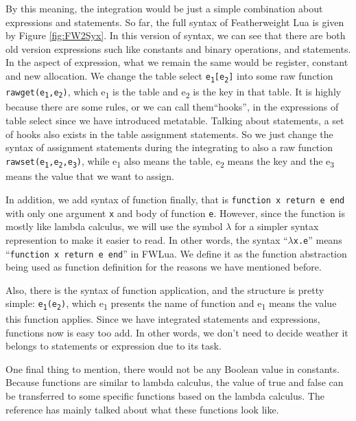 By this meaning, the integration would be just a simple combination about expressions and statements. So far, the full syntax of Featherweight Lua is given by Figure \ref{fig:FW2Syx}. In this version of syntax, we can see that there are both old version expressions such like constants and binary operations, and statements. In the aspect of expression, what we remain the same would be register, constant and new allocation. We change the table select {\tt e\textsubscript{1}[e\textsubscript{2}]} into some raw function {\tt rawget(e\textsubscript{1},e\textsubscript{2})}, which e\textsubscript{1} is the table and e\textsubscript{2} is the key in that table. It is highly because there are some rules, or we can call them``hooks'', in the expressions of table select since we have introduced metatable. Talking about statements, a set of hooks also exists in the table assignment statements. So we just change the syntax of assignment statements during the integrating to also a raw function {\tt rawset(e\textsubscript{1},e\textsubscript{2},e\textsubscript{3})}, while e\textsubscript{1} also means the table, e\textsubscript{2} means the key and the e\textsubscript{3} means the value that we want to assign. 

In addition, we add syntax of function finally, that is {\tt function x return e end} with only one argument {\tt x} and body of function {\tt e}. However, since the function is mostly like lambda calculus, we will use the symbol $\lambda$ for a simpler syntax represention to make it easier to read. In other words, the syntax ``{\tt $\lambda$x.e}'' means ``{\tt function x return e end}'' in FWLua. We define it as the function abstraction being used as function definition for the reasons we have mentioned before. 

Also, there is the syntax of function application, and the structure is pretty simple: {\tt e\textsubscript{1}(e\textsubscript{2})}, which e\textsubscript{1} presents the name of function and e\textsubscript{1} means the value this function applies. Since we have integrated statements and expressions, functions now is easy too add. In other words, we don't need to decide weather it belongs to statements or expression due to its task.

One final thing to mention, there would not be any Boolean value in constants. Because functions are similar to lambda calculus, the value of true and false can be transferred to some specific functions based on the lambda calculus. The reference\cite{LC} has mainly talked about what these functions look like.


